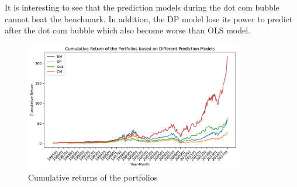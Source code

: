 \begin{enumerate}[(a)]
    It is interesting to see that the prediction models during the dot com bubble cannot beat the benchmark. In addition, the DP model lose its power to predict after the dot com bubble which also become worse than OLS model.

    \begin{figure}[htbp!]
        \centering
        \includegraphics[width=0.85\textwidth]{Out/Ex4_C.pdf}
        \caption{Cumulative returns of the portfolios}
        \label{fig:my_label}
    \end{figure}
\end{enumerate}